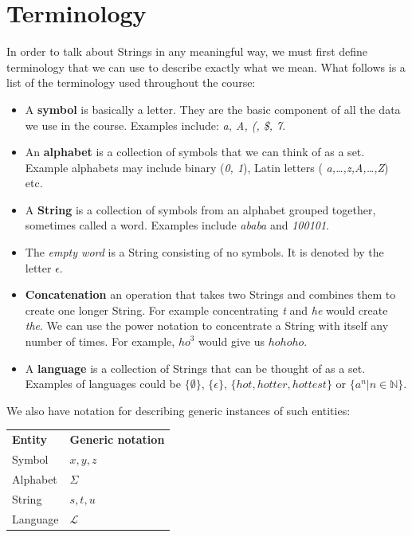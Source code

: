 
\section{Terminology}

In order to talk about Strings in any meaningful way, we must first define
terminology that we can use to describe exactly what we mean. What follows is a
list of the terminology used throughout the course:

\begin{itemize}
  \item A {\bf symbol} is basically a letter. They are the basic component of
  all the data we use in the course. Examples include: {\it a, A, (, \$, 7}.
  \item An {\bf alphabet} is a collection of symbols that we can think of as a
  set. Example alphabets may include binary ({\it 0, 1}), Latin letters ({\it
  a,\dots,z,A,\dots,Z}) etc.
  \item A {\bf String} is a collection of symbols from an alphabet grouped
  together, sometimes called a word. Examples include {\it ababa} and
  {\it 100101}.
  \item The {\it empty word} is a String consisting of no symbols. It is
  denoted by the letter $\epsilon$.
  \item {\bf Concatenation} an operation that takes two Strings and combines
  them to create one longer String. For example concentrating {\it t} and {\it
  he} would create {\it the}. We can use the power notation to concentrate a
  String with itself any number of times. For example, ${ho}^3$ would give us
  $hohoho$.
  \item A {\bf language} is a collection of Strings that can be thought of as
  a set. Examples of languages could be $\{\emptyset\}$, $\{\epsilon\}$,
  $\{hot,hotter,hottest\}$ or $\{a^n | n \in \mathbb{N}\}$.
\end{itemize}

We also have notation for describing generic instances of such entities:

\begin{center}
  \begin{tabular}{l l}
    {\bf Entity} & {\bf Generic notation}\\
    Symbol & $x, y, z$\\
    Alphabet & $\Sigma$\\
    String & $s, t, u$\\
    Language & $\mathcal{L}$\\
  \end{tabular}
\end{center}

